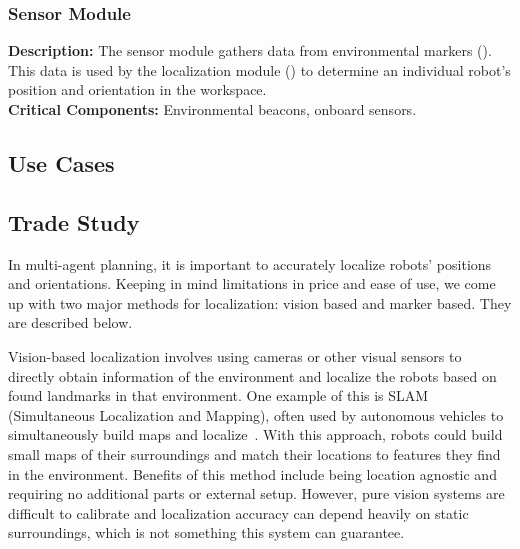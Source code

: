 \subsubsection{Sensor Module}
\label{sec:subsystem_sensors}
\textbf{Description:} The sensor module gathers data from environmental markers (). This data is used by the localization module () to determine an individual robot's position and orientation in the workspace. \\
\textbf{Critical Components:} Environmental beacons, onboard sensors. \\

\subsection{Use Cases}

\subsection{Trade Study}
\label{sec:trade_localization}
In multi-agent planning, it is important to accurately localize robots' positions and orientations. Keeping in mind limitations in price and ease of use, we come up with two major methods for localization: vision based and marker based. They are described below.

Vision-based localization involves using cameras or other visual sensors to directly obtain information of the environment and localize the robots based on found landmarks in that environment. One example of this is SLAM (Simultaneous Localization and Mapping), often used by autonomous vehicles to simultaneously build maps and localize~\cite{dissanayake2001solution}. With this approach, robots could build small maps of their surroundings and match their locations to features they find in the environment. Benefits of this method include being location agnostic and requiring no additional parts or external setup. However, pure vision systems are difficult to calibrate and localization accuracy can depend heavily on static surroundings, which is not something this system can guarantee.

